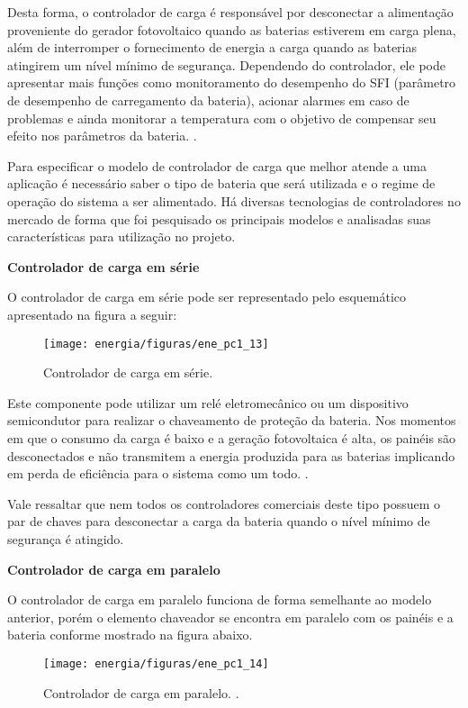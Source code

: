 	Desta forma, o controlador de carga é responsável por desconectar a alimentação proveniente do gerador fotovoltaico quando as baterias estiverem em carga plena, além de interromper o fornecimento de energia a carga quando as baterias atingirem um nível mínimo de segurança. Dependendo do controlador, ele pode apresentar mais funções como monitoramento do desempenho do SFI (parâmetro de desempenho de carregamento da bateria), acionar alarmes em caso de problemas e ainda monitorar a temperatura com o objetivo de compensar seu efeito nos parâmetros da bateria. \cite{Cresesb}. 
	
Para especificar o modelo de controlador de carga que melhor atende a uma aplicação é necessário saber o tipo de bateria que será utilizada e o regime de operação do sistema a ser alimentado. Há diversas tecnologias de controladores no mercado de forma que foi pesquisado os principais modelos e analisadas suas características para utilização no projeto. 

	\textbf{Controlador de carga em série}

	O controlador de carga em série pode ser representado pelo esquemático apresentado na figura a seguir:

	\begin{figure}[H]
		\centering
		\texttt{[image: energia/figuras/ene\_pc1\_13]}
		\caption{Controlador de carga em série. \cite{Cresesb}}
		\label{ene_pc1_13}
	\end{figure}
	

	Este componente pode utilizar um relé eletromecânico ou um dispositivo semicondutor para realizar o chaveamento de proteção da bateria. Nos momentos em que o consumo da carga é baixo e a geração fotovoltaica é alta, os painéis são desconectados e não transmitem a energia produzida para as baterias implicando em perda de eficiência para o sistema como um todo. \cite{Cresesb}.
	
	Vale ressaltar que nem todos os controladores comerciais deste tipo possuem o par de chaves para desconectar a carga da bateria quando o nível mínimo de segurança é atingido. 
	
	\textbf{Controlador de carga em paralelo}

	O controlador de carga em paralelo funciona de forma semelhante ao modelo anterior, porém o elemento chaveador se encontra em paralelo com os painéis e a bateria conforme mostrado na figura abaixo.

	\begin{figure}[H]
		\centering
		\texttt{[image: energia/figuras/ene\_pc1\_14]}
		\caption{Controlador de carga em paralelo. \cite{Cresesb}.}
		\label{ene_pc1_14}
	\end{figure}


